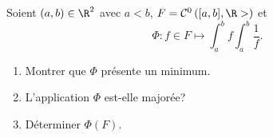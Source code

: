 \begin{enonce}
\begin{exercise}[ID={RMS125 E580, 2014 Mines-Ponts MP},subtitle={2014 Mines-Ponts MP},tags={}, difficulty={0}]
Soient $(a,b)\in\R^2$ avec $a<b$, $F=\mathcal{C}^0\left( [a,b], \R> \right)$ et
\begin{equation*}
  \Phi: f\in F\mapsto \int_a^b f \int_a^b \frac1f.
\end{equation*}
\begin{enumerate}
  \item Montrer que $\Phi$ présente un minimum.
  \item L'application $\Phi$ est-elle majorée?
  \item Déterminer $\Phi(F)$.
\end{enumerate}
\end{exercise}
\begin{solution}
\end{solution}
\end{enonce}

